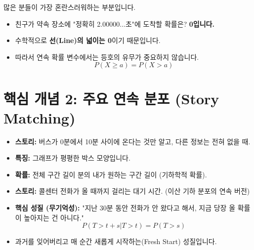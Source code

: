 \documentclass[11pt,a4paper]{book}
\theoremstyle{definition}
\begin{document}
\begin{warningbox}[title={점의 확률은 0이다 ($P(X=x)=0$)}]
많은 분들이 가장 혼란스러워하는 부분입니다.
\begin{itemize}
    \item 친구가 약속 장소에 "정확히 2.00000...초"에 도착할 확률은? \textbf{0입니다.}
    \item 수학적으로 \textbf{선(Line)의 넓이는 0}이기 때문입니다.
    \item 따라서 연속 확률 변수에서는 등호의 유무가 중요하지 않습니다.
    \[ P(X \ge a) = P(X > a) \]
\end{itemize}
\end{warningbox}

\section{핵심 개념 2: 주요 연속 분포 (Story Matching)}

\begin{storybox}[title={1. 균등 분포 (Uniform): "정보 부재의 공평함"}]
\begin{itemize}
    \item \textbf{스토리:} 버스가 0분에서 10분 사이에 온다는 것만 알고, 다른 정보는 전혀 없을 때.
    \item \textbf{특징:} 그래프가 평평한 박스 모양입니다.
    \item \textbf{확률:} 전체 구간 길이 분의 내가 원하는 구간 길이 (기하학적 확률).
\end{itemize}
\end{storybox}

\begin{storybox}[title={2. 지수 분포 (Exponential): "무기억성(Memoryless)"}]
\begin{itemize}
    \item \textbf{스토리:} 콜센터 전화가 올 때까지 걸리는 대기 시간. (이산 기하 분포의 연속 버전)
    \item \textbf{핵심 성질 (무기억성):} "지난 30분 동안 전화가 안 왔다고 해서, 지금 당장 올 확률이 높아지는 건 아니다."
    \[ P(T > t+s | T > t) = P(T > s) \]
    \item 과거를 잊어버리고 매 순간 새롭게 시작하는(Fresh Start) 성질입니다.
\end{itemize}
\end{storybox}
\end{document}
